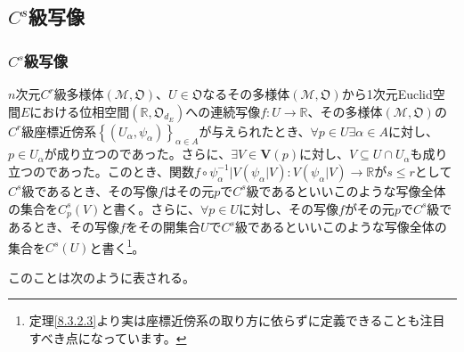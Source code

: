 \documentclass[dvipdfmx]{jsarticle}
\begin{document}
\subsection{$C^{s}$級写像}%
\subsubsection{$C^{s}$級写像}%
\begin{dfn}\label{写像はCs級であることの定義}
$n$次元$C^{r}$級多様体$\left( \mathcal{M},\mathfrak{O} \right)$、$U \in \mathfrak{O}$なるその多様体$\left( \mathcal{M},\mathfrak{O} \right)$から1次元Euclid空間$E$における位相空間$\left( \mathbb{R},\mathfrak{O}_{d_{E}} \right)$への連続写像$f:U \rightarrow \mathbb{R}$、その多様体$\left( \mathcal{M},\mathfrak{O} \right)$の$C^{r}$級座標近傍系$\left\{ \left( U_{\alpha},\psi_{\alpha} \right) \right\}_{\alpha \in A}$が与えられたとき、$\forall p\in U\exists\alpha \in A$に対し、$p \in U_{\alpha}$が成り立つのであった。さらに、$\exists V \in \mathbf{V} \left(p\right) $に対し、$V \subseteq U \cap U_{\alpha}$も成り立つのであった。このとき、関数$f \circ \psi_{\alpha}^{- 1}|V\left( \psi_{\alpha}|V \right):V\left( \psi_{\alpha}|V \right) \rightarrow \mathbb{R}$が$s \leq r$として$C^{s}$級であるとき、その写像$f$はその元$p$で$C^{s}$級であるといいこのような写像全体の集合を$C^s_p \left( V\right) $と書く。さらに、$\forall p \in U$に対し、その写像$f$がその元$p$で$C^{s}$級であるとき、その写像$f$をその開集合$U$で$C^s$級であるといいこのような写像全体の集合を$C^s \left( U\right)$と書く\footnote{定理\ref{8.3.2.3}より実は座標近傍系の取り方に依らずに定義できることも注目すべき点になっています。}。
\end{dfn}\par
このことは次のように表される。
\end{document}
